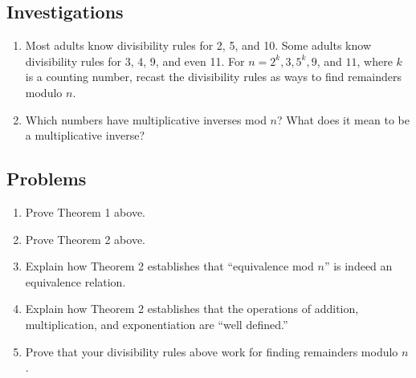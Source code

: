 \documentclass[10.5pt]{report}
\begin{document}
\subsection*{Investigations}
\begin{enumerate}
\item Most adults know divisibility rules for 2, 5, and 10.  Some adults know divisibility rules for 3, 4, 9, and even 11.  For $n = 2^k, 3, 5^k, 9$, and $11$, where $k$ is a counting number, recast the divisibility rules as ways to find remainders modulo $n$.
\item Which numbers have multiplicative inverses mod $n$?  What does it mean to be a multiplicative inverse?  
\end{enumerate}

\subsection*{Problems}
\begin{enumerate}
\item Prove Theorem 1 above.
\item Prove Theorem 2 above. 
\item Explain how Theorem 2 establishes that ``equivalence mod $n$'' is indeed an equivalence relation. 
\item Explain how Theorem 2 establishes that the operations of addition, multiplication, and exponentiation are ``well defined.''
\item Prove that your divisibility rules above work for finding remainders modulo $n$.  
\end{enumerate}
\end{document}
